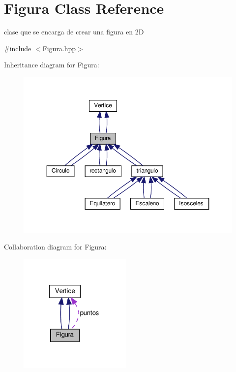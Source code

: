 \hypertarget{class_figura}{}\section{Figura Class Reference}
\label{class_figura}


clase que se encarga de crear una figura en 2D  




{\ttfamily \#include $<$Figura.\+hpp$>$}



Inheritance diagram for Figura\+:
\nopagebreak
\begin{figure}[H]
\begin{center}
\leavevmode
\includegraphics[width=350pt]{class_figura__inherit__graph}
\end{center}
\end{figure}


Collaboration diagram for Figura\+:
\nopagebreak
\begin{figure}[H]
\begin{center}
\leavevmode
\includegraphics[width=157pt]{class_figura__coll__graph}
\end{center}
\end{figure}
